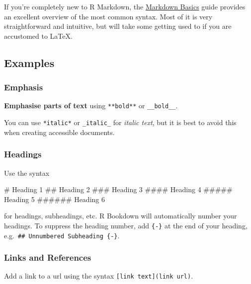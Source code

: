 \documentclass[
  letterpaper,
  oneside]{book}
\newenvironment{Shaded}{\begin{snugshade}}{\end{snugshade}}
\newcommand{\FunctionTok}[1]{\textcolor[rgb]{0.28,0.35,0.67}{#1}}
\numberwithin{equation}{section}
\numberwithin{figure}{section}
\theoremstyle{break}
\theoremstyle{plain}
\theoremstyle{remark}
\begin{document}
If you're completely new to R Markdown, the
\href{https://rmarkdown.rstudio.com/authoring_basics.html?target=_blank}{Markdown
Basics} guide provides an excellent overview of the most common syntax.
Most of it is very straightforward and intuitive, but will take some
getting used to if you are accustomed to LaTeX.

\subsection{Examples}\label{examples}

\subsubsection*{Emphasis}\label{emphasis}

\textbf{Emphasise parts of text} using \texttt{**bold**} or
\texttt{\_\_bold\_\_}.

You can use \texttt{*italic*} or \texttt{\_italic\_} for \emph{italic
text}, but it is best to avoid this when creating accessible documents.

\subsubsection*{Headings}\label{headings}

Use the syntax

\begin{Shaded}
\begin{Highlighting}[]
\FunctionTok{\# Heading 1}
\FunctionTok{\#\# Heading 2}
\FunctionTok{\#\#\# Heading 3}
\FunctionTok{\#\#\#\# Heading 4}
\FunctionTok{\#\#\#\#\# Heading 5}
\FunctionTok{\#\#\#\#\#\# Heading 6}
\end{Highlighting}
\end{Shaded}

for headings, subheadings, etc. R Bookdown will automatically number
your headings. To suppress the heading number, add \texttt{\{-\}} at the
end of your heading, e.g.~\texttt{\#\#\ Unnumbered\ Subheading\ \{-\}}.

\subsubsection*{Links and References}\label{links-and-references}

Add a link to a url using the syntax
\texttt{{[}link\ text{]}(link\ url)}.
\end{document}
